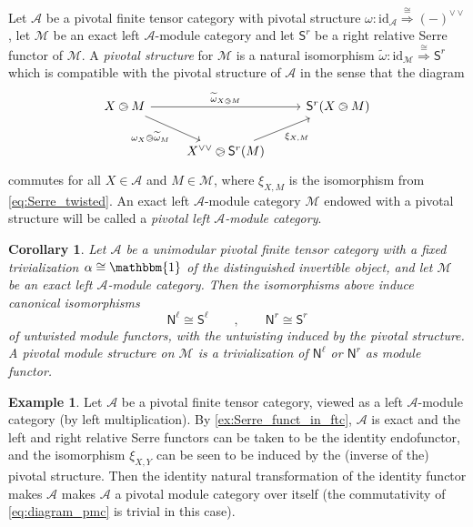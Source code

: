 \documentclass[11pt]{article}
\newtheorem{corollary}[theorem]{Corollary}
\theoremstyle{definition}
\newtheorem{example}[theorem]{Example}
\begin{document}
Let $\mathcal{A}$ be a pivotal finite tensor category with pivotal structure $\omega: \mathrm{id}_\mathcal{A} \overset{\cong}{\Longrightarrow} (-)^{\vee \vee}$, let $\mathcal{M}$ be an exact left $\mathcal{A}$-module category and let $\mathsf{S}^r$ be a right relative Serre functor of $\mathcal{M}$. A \emph{pivotal structure} for $\mathcal{M}$ is a natural isomorphism $\widetilde{\omega}: \mathrm{id}_\mathcal{M} \overset{\cong}{\Longrightarrow} \mathsf{S}^r$ which is compatible with the pivotal structure of $\mathcal{A}$ in the sense that the diagram
\begin{equation}\label{eq:diagram_pmc}
\begin{tikzcd}
X \ogreaterthan M \arrow{rr}{\widetilde{\omega}_{X \ogreaterthan M}} \arrow{dr}[swap]{\omega_X \ogreaterthan  \widetilde{\omega}_{ M}} && \mathsf{S}^r(X \ogreaterthan M)\\
&   X^{\vee \vee} \ogreaterthan \mathsf{S}^r(M)  \arrow{ur}[swap]{\xi_{X,M}}  &
\end{tikzcd}
\end{equation}
commutes for all $X\in \mathcal{A}$ and $M \in \mathcal{M}$, where $\xi_{X,M}$ is the isomorphism from \eqref{eq:Serre_twisted}. An exact  left $\mathcal{A}$-module category $\mathcal{M}$ endowed with a pivotal structure will be called a \emph{pivotal left $\mathcal{A}$-module category}.

\begin{corollary}\label{corfss}
	Let $\mathcal{A}$ be  a unimodular pivotal finite tensor category with a fixed trivialization
	$\alpha \cong \mathbbm{1}$ of the distinguished invertible object, and let $\mathcal{M}$ be an exact left $\mathcal{A}$-module category. Then the isomorphisms above induce canonical isomorphisms
	$$ \mathsf{N}^\ell \cong  \mathsf{S}^\ell \qquad , \qquad  \mathsf{N}^r \cong  \mathsf{S}^r $$
	of untwisted module functors, with the untwisting induced by the pivotal structure.
	A pivotal module structure on $\mathcal{M}$ is a trivialization of $\mathsf{N}^\ell$ or $\mathsf{N}^r$ as module functor.
\end{corollary}



\begin{example}
Let $\mathcal{A}$ be a pivotal finite tensor category, viewed as a left $\mathcal{A}$-module category (by left multiplication). By \cref{ex:Serre_funct_in_ftc}, $\mathcal{A}$ is exact and the left and right relative Serre functors can be taken to be the identity endofunctor, and the isomorphism $\xi_{X,Y}$ can be seen to be induced by the (inverse of the) pivotal structure. Then the identity natural transformation of the identity functor makes $\mathcal{A}$ makes $\mathcal{A}$ a pivotal module category over itself (the commutativity of \eqref{eq:diagram_pmc} is trivial in this case).
\end{example}
\end{document}
